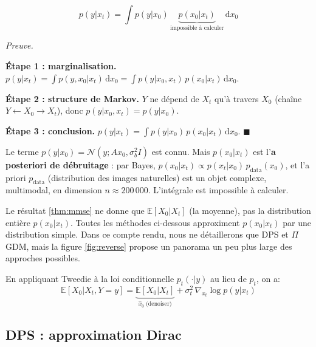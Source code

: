 \documentclass[12pt]{article}
\renewcommand{\qedsymbol}{$\blacksquare$}
\renewenvironment{proof}[1][\proofname]{%
  \par\medskip\noindent
  \textit{\color{proofgray}#1.}\enspace\ignorespaces
}{\hfill\qedsymbol\par\medskip}
\renewcommand{\proofname}{Preuve}
\begin{document}
\begin{propositionbox}
\label{prop:intract}
\begin{equation}
    p(y | x_t) = \int p(y | x_0)\, \underbrace{p(x_0 | x_t)}_{\text{impossible à calculer}}\, \mathrm{d}x_0
\end{equation}
\end{propositionbox}

  \begin{proof}







\textbf{Étape 1 : marginalisation.} $p(y | x_t) = \int p(y, x_0 | x_t)\, \mathrm{d}x_0 = \int p(y | x_0, x_t)\, p(x_0 | x_t)\, \mathrm{d}x_0$.

\textbf{Étape 2 : structure de Markov.} $Y$ ne dépend de $X_t$ qu'à travers $X_0$ (chaîne $Y \leftarrow X_0 \to X_t$), donc $p(y | x_0, x_t) = p(y | x_0)$.

\textbf{Étape 3 : conclusion.} $p(y | x_t) = \int p(y | x_0)\, p(x_0 | x_t)\, \mathrm{d}x_0$.
\end{proof}

Le terme $p(y | x_0) = \mathcal{N}(y; Ax_0, \sigma_b^2 I)$ est connu. Mais $p(x_0 | x_t)$ est l'\textbf{a posteriori de débruitage} : par Bayes, $p(x_0 | x_t) \propto p(x_t | x_0)\, p_{\text{data}}(x_0)$, et l'a priori $p_{\text{data}}$ (distribution des images naturelles) est un objet complexe, multimodal, en dimension $n \approx 200\,000$. L'intégrale est impossible à calculer.

Le résultat \ref{thm:mmse} ne donne que $\mathbb{E}[X_0 | X_t]$ (la moyenne), pas la distribution entière $p(x_0 | x_t)$. Toutes les méthodes ci-dessous approximent $p(x_0 | x_t)$ par une distribution simple. Dans ce compte rendu, nous ne détaillerons que DPS et $\Pi$GDM, mais la figure \ref{fig:reverse} propose un panorama un peu plus large des approches possibles.

\begin{remarkbox}
En appliquant Tweedie à la loi conditionnelle $p_t(\cdot | y)$ au lieu de $p_t$, on a:
\[
\mathbb{E}[X_0 | X_t, Y = y] = \underbrace{\mathbb{E}[X_0 | X_t]}_{\hat{x}_0 \;\text{(denoiser)}} + \sigma_t^2\, \nabla_{x_t} \log p(y | x_t)
\]
\end{remarkbox}


\subsection{DPS : approximation Dirac}
\end{document}
